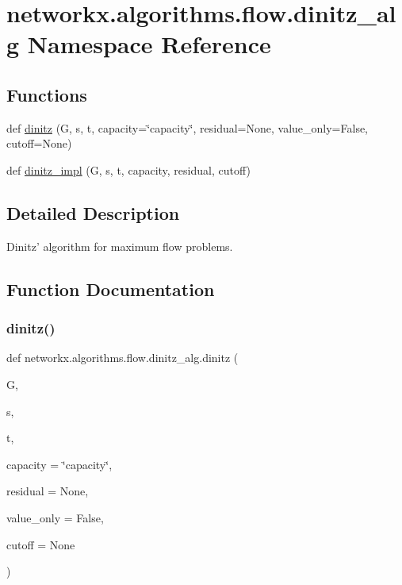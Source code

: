 \hypertarget{namespacenetworkx_1_1algorithms_1_1flow_1_1dinitz__alg}{}\section{networkx.\+algorithms.\+flow.\+dinitz\+\_\+alg Namespace Reference}
\label{namespacenetworkx_1_1algorithms_1_1flow_1_1dinitz__alg}
\subsection*{Functions}
\begin{DoxyCompactItemize}
\item 
def \hyperlink{namespacenetworkx_1_1algorithms_1_1flow_1_1dinitz__alg_a93a97ebaac68eebe33344fea5a99ab7b}{dinitz} (G, s, t, capacity=\char`\"{}capacity\char`\"{}, residual=None, value\+\_\+only=False, cutoff=None)
\item 
def \hyperlink{namespacenetworkx_1_1algorithms_1_1flow_1_1dinitz__alg_a1d07bffbc7f8b656b31b1b4bdf5fe8f9}{dinitz\+\_\+impl} (G, s, t, capacity, residual, cutoff)
\end{DoxyCompactItemize}


\subsection{Detailed Description}
\begin{DoxyVerb}Dinitz' algorithm for maximum flow problems.
\end{DoxyVerb}
 

\subsection{Function Documentation}
\mbox{\label{namespacenetworkx_1_1algorithms_1_1flow_1_1dinitz__alg_a93a97ebaac68eebe33344fea5a99ab7b}} 
\subsubsection{\texorpdfstring{dinitz()}{dinitz()}}
{\footnotesize\ttfamily def networkx.\+algorithms.\+flow.\+dinitz\+\_\+alg.\+dinitz (\begin{DoxyParamCaption}\item[{}]{G,  }\item[{}]{s,  }\item[{}]{t,  }\item[{}]{capacity = {\ttfamily \char`\"{}capacity\char`\"{}},  }\item[{}]{residual = {\ttfamily None},  }\item[{}]{value\+\_\+only = {\ttfamily False},  }\item[{}]{cutoff = {\ttfamily None} }\end{DoxyParamCaption})}

